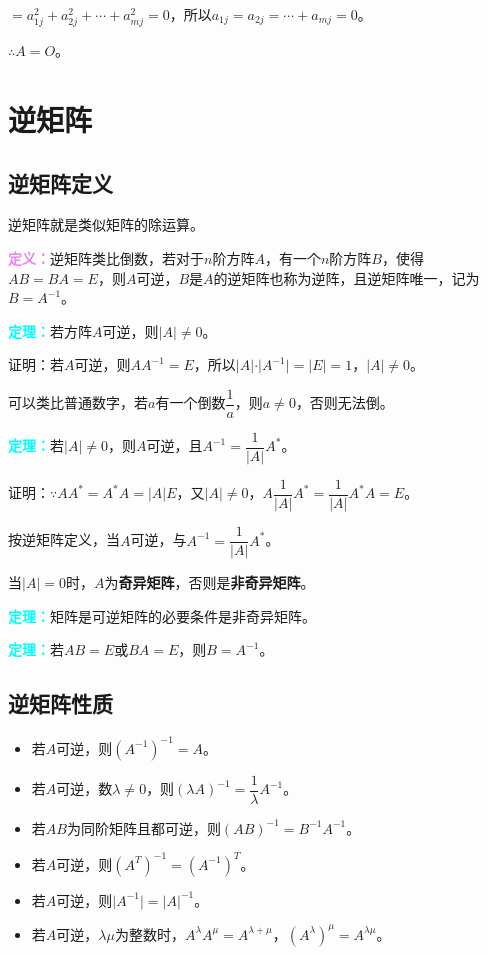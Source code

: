 \documentclass[UTF8, 12pt]{ctexart}
\begin{document}
$=a_{1j}^2+a_{2j}^2+\cdots+a_{mj}^2=0$，所以$a_{1j}=a_{2j}=\cdots+a_{mj}=0$。

$\therefore A=O$。

\section{逆矩阵}

\subsection{逆矩阵定义}

逆矩阵就是类似矩阵的除运算。

\textcolor{violet}{\textbf{定义：}}逆矩阵类比倒数，若对于$n$阶方阵$A$，有一个$n$阶方阵$B$，使得$AB=BA=E$，则$A$可逆，$B$是$A$的逆矩阵也称为逆阵，且逆矩阵唯一，记为$B=A^{-1}$。

\textcolor{aqua}{\textbf{定理：}}若方阵$A$可逆，则$\vert A\vert\neq 0$。

证明：若$A$可逆，则$AA^{-1}=E$，所以$\vert A\vert\cdot\vert A^{-1}\vert=\vert E\vert=1$，$\vert A\vert\neq 0$。

可以类比普通数字，若$a$有一个倒数$\dfrac{1}{a}$，则$a\neq 0$，否则无法倒。

\textcolor{aqua}{\textbf{定理：}}若$\vert A\vert\neq 0$，则$A$可逆，且$A^{-1}=\dfrac{1}{\vert A\vert}A^*$。

证明：$\because AA^*=A^*A=\vert A\vert E$，又$\vert A\vert\neq 0$，$A\dfrac{1}{\vert A\vert}A^*=\dfrac{1}{\vert A\vert}A^*A=E$。

按逆矩阵定义，当$A$可逆，与$A^{-1}=\dfrac{1}{\vert A\vert}A^*$。

当$\vert A\vert=0$时，$A$为\textbf{奇异矩阵}，否则是\textbf{非奇异矩阵}。

\textcolor{aqua}{\textbf{定理：}}矩阵是可逆矩阵的必要条件是非奇异矩阵。

\textcolor{aqua}{\textbf{定理：}}若$AB=E$或$BA=E$，则$B=A^{-1}$。

\subsection{逆矩阵性质}

\begin{itemize}
\item 若$A$可逆，则$(A^{-1})^{-1}=A$。
\item 若$A$可逆，数$\lambda\neq0$，则$(\lambda A)^{-1}=\dfrac{1}{\lambda}A^{-1}$。
\item 若$AB$为同阶矩阵且都可逆，则$(AB)^{-1}=B^{-1}A^{-1}$。
\item 若$A$可逆，则$(A^T)^{-1}=(A^{-1})^T$。
\item 若$A$可逆，则$\vert A^{-1}\vert=\vert A\vert^{-1}$。
\item 若$A$可逆，$\lambda\mu$为整数时，$A^\lambda A^\mu=A^{\lambda+\mu}$，$(A^\lambda)^\mu=A^{\lambda\mu}$。
\end{itemize}
\end{document}
